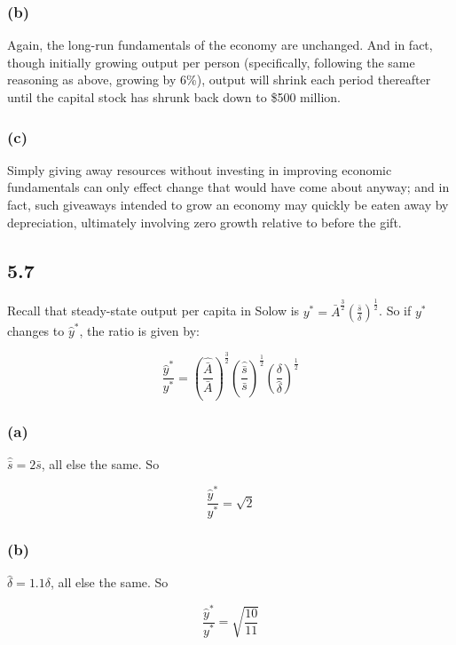 \documentclass{article}
\begin{document}
\subsubsection*{(b)}

Again, the long-run fundamentals of the economy are unchanged. And in fact, though initially growing output per person (specifically, following the same reasoning as above, growing by 6\%), output will shrink each period thereafter until the capital stock has shrunk back down to \$500 million.

\subsubsection*{(c)}

Simply giving away resources without investing in improving economic fundamentals can only effect change that would have come about anyway; and in fact, such giveaways intended to grow an economy may quickly be eaten away by depreciation, ultimately involving zero growth relative to before the gift.

\subsection*{5.7}

Recall that steady-state output per capita in Solow is $y^{*} = \bar{A}^{\frac32} \left( \frac{\bar{s}}{\delta} \right)^{\frac12}$. So if $y^{*}$ changes to $\hat{y}^{*}$, the ratio is given by:

\[ \frac{\hat{y}^{*}}{y^{*}} = \left( \frac{\hat{\bar{A}}}{\bar{A}} \right)^{\frac32} \left( \frac{\hat{\bar{s}}}{\bar{s}} \right)^{\frac12} \left( \frac{\delta}{\hat{\delta}} \right)^{\frac12}\]

\subsubsection*{(a)}

$\hat{\bar{s}} = 2\bar{s}$, all else the same. So

\[ \frac{\hat{y}^{*}}{y^{*}} = \sqrt{2} \]

\subsubsection*{(b)}

$\hat{\delta} = 1.1 \delta$, all else the same. So

\[ \frac{\hat{y}^{*}}{y^{*}} = \sqrt{\frac{10}{11}} \]
\end{document}
